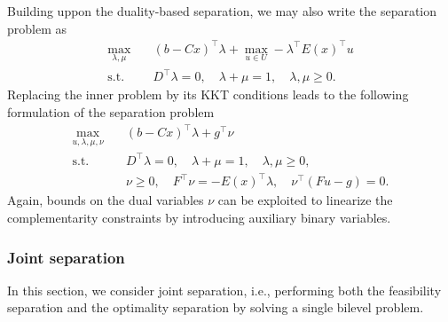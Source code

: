 Building uppon the duality-based separation, we may also write the separation
problem as 
%
\begin{align*}
    \max_{\lambda,\mu} \quad & (b - Cx)^\top\lambda + \max_{u\in U} -\lambda^\top E(x)^\top u \\
    \text{s.t.} \quad & D^\top\lambda = 0, \quad \lambda + \mu = 1, \quad \lambda,\mu\ge 0.
\end{align*}
Replacing the inner problem by its KKT conditions leads to the following
formulation of the separation problem
\begin{align*}
    \max_{u,\lambda,\mu,\nu} \quad & (b - Cx)^\top\lambda + g^\top\nu \\
    \text{s.t.} \quad & D^\top\lambda = 0, \quad \lambda + \mu = 1, \quad \lambda,\mu\ge 0, \\
    & \nu \ge 0, \quad F^\top\nu = -E(x)^\top\lambda, \quad \nu^\top(Fu - g) = 0.
\end{align*}
Again, bounds on the dual variables $\nu$ can be exploited to linearize the
complementarity constraints by introducing auxiliary binary variables.

\subsubsection{Joint separation}

In this section, we consider joint separation, i.e., performing both the
feasibility separation and the optimality separation by solving a single
bilevel problem.



